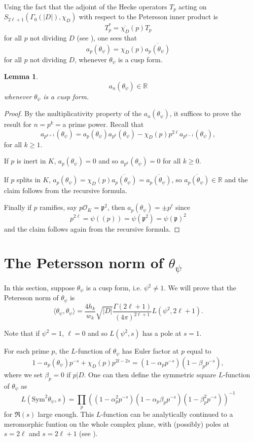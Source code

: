 \documentclass[twoside,10pt]{article}
\newtheorem{lemma}{Lemma}
\newcommand{\R}{\mathbb{R}}
\newcommand{\p}{\mathfrak{p}}
\renewcommand{\O}{\mathcal{O}}
\newcommand{\tpsi}{\theta_\psi}
\begin{document}
Using the fact that the adjoint of the Hecke operators $T_p$ acting on $S_{2\ell+1}(\Gamma_0(|D|),\chi_D)$ with respect to the Petersson inner product is
\[T_p^*=\overline{\chi_D}(p)T_p\]
for all $p$ not dividing $D$ (see \cite[Thm. 5.5.3]{DiSh}), one sees that 
\[a_p(\tpsi)=\chi_D(p)\overline{a_p(\tpsi)}\]
for all $p$ not dividing $D$, whenever $\tpsi$ is a cusp form.

\begin{lemma}\label{realFourrier}
	\[a_n(\tpsi)\in\R\]
	whenever $\tpsi$ is a cusp form.
\end{lemma}
\begin{proof}
	By the multiplicativity property of the $a_n(\tpsi)$, it suffices to prove the result for $n=p^k=$a prime power. Recall that
	\[a_{p^{k+1}}(\tpsi)=a_{p}(\tpsi)a_{p^k}(\tpsi)-\chi_D(p)p^{2\ell}a_{p^{k-1}}(\tpsi),\]
	for all $k\geq1$.
	
	If $p$ is inert in $K$, $a_p(\tpsi)=0$ and so $a_{p^k}(\tpsi)=0$ for all $k\geq 0$.
	
	If $p$ splits in $K$, $a_{p}(\tpsi)=\chi_D(p)\overline{a_{p}(\tpsi)}=\overline{a_{p}(\tpsi)}$, so $\overline{a_{p}(\tpsi)}\in\R$ and the claim follows from the recursive formula.
	
	Finally if $p$ ramifies, say $p\O_K=\p^2$, then $a_{p}(\tpsi)=\pm p^\ell$ since
	\[p^{2\ell}=\psi((p))=\psi(\p^2)=\psi(\p)^2\]
	and the claim follows again from the recursive formula.
\end{proof}

\section{The Petersson norm of $\tpsi$}
In this section, suppose $\tpsi$ is a cusp form, i.e. $\psi^2\neq 1$. We will prove that the Petersson norm of $\tpsi$ is
\begin{equation}\label{NormLpsi}
\langle\tpsi,\tpsi\rangle=\frac{4h_k}{w_k}\sqrt{|D|}\frac{\Gamma(2\ell+1)}{(4\pi)^{2\ell+1}}L(\psi^2,2\ell+1).
\end{equation}

Note that if $\psi^2=1$, $\ell=0$ and so $L(\psi^2,s)$ has a pole at $s=1$.

For each prime $p$, the $L$-function of $\tpsi$ has Euler factor at $p$ equal to
\[1-a_p(\tpsi)p^{-s}+\chi_D(p)p^{2l-2s}=(1-\alpha_pp^{-s})(1-\beta_pp^{-s}),\]
where we set $\beta_p=0$ if $p|D$. One can then define the symmetric square $L$-function of $\tpsi$ as
\[L(\text{Sym}^2\tpsi,s)=\prod_{p}((1-\alpha_p^2p^{-s})(1-\alpha_p\beta_pp^{-s})(1-\beta_p^2p^{-s}))^{-1}\]
for $\Re(s)$ large enough. This $L$-function can be analytically continued to a meromorphic funtion on the whole complex plane, with (possibly) poles at $s=2\ell$ and $s=2\ell+1$ (see \cite[Thm. 2]{Shi2}).
\end{document}
